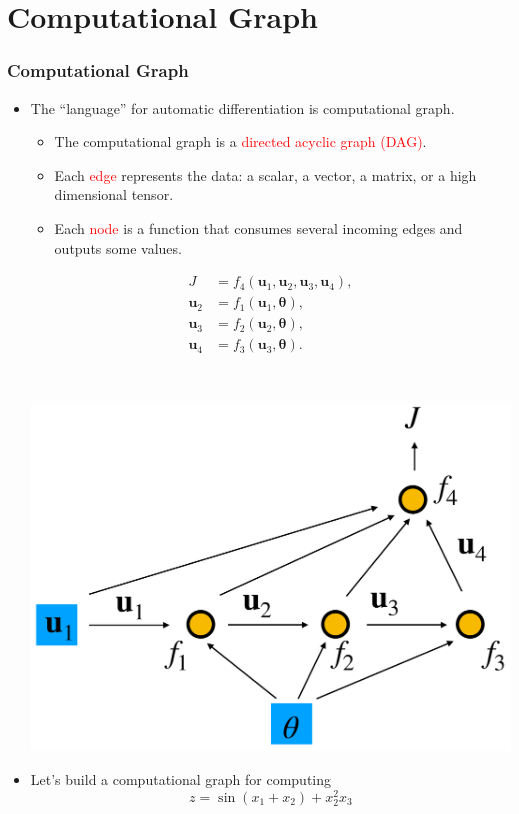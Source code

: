 \documentclass{beamer}
\newcommand{\red}[1]{\textcolor{red}{#1}}
\begin{document}
\section{Computational Graph}

\begin{frame}
	\frametitle{Computational Graph}

	\begin{itemize}
		\item The ``language'' for automatic differentiation is computational graph.
		      \begin{itemize}
			      \item The computational graph is a \red{directed acyclic graph (DAG)}.
			      \item Each \red{edge} represents the data: a scalar, a vector, a matrix, or a high dimensional tensor.
			      \item Each \red{node} is a function that consumes several incoming edges and outputs some values.
		      \end{itemize}
		      \begin{minipage}[c]{0.45\textwidth}
			      \begin{align*}
				      J            & = f_4(\mathbf{u}_1, \mathbf{u}_2, \mathbf{u}_3, \mathbf{u}_4), \\
				      \mathbf{u}_2 & = f_1(\mathbf{u}_1, \bm {\theta}),                             \\
				      \mathbf{u}_3 & = f_2(\mathbf{u}_2, \bm {\theta}),                             \\
				      \mathbf{u}_4 & = f_3(\mathbf{u}_3, \bm {\theta}).
			      \end{align*}
		      \end{minipage}~
		      \begin{minipage}[c]{0.45\textwidth}
			      \includegraphics[width=1.0\textwidth]{figures/adjoint}
		      \end{minipage}
		\item  Let's build a computational graph for computing
		      $$z=\sin(x_1+x_2) + x_2^2x_3$$

	\end{itemize}
\end{frame}
\end{document}
